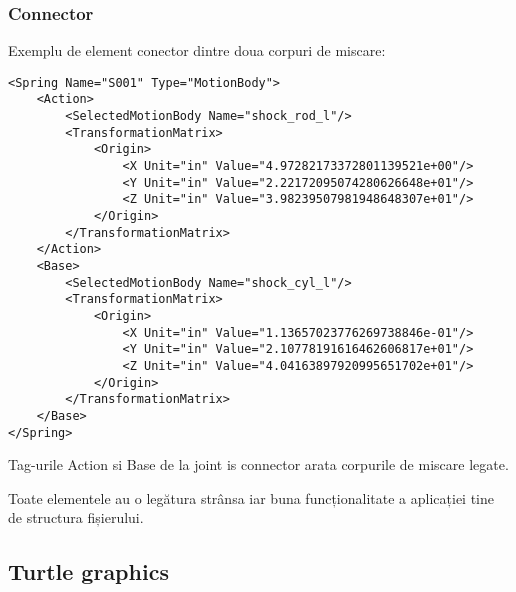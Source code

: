 \subsubsection{Connector}
Exemplu de element conector dintre doua corpuri de miscare:

\lstset{language=XML}
\begin{lstlisting}
<Spring Name="S001" Type="MotionBody">
    <Action>
        <SelectedMotionBody Name="shock_rod_l"/>
        <TransformationMatrix>
            <Origin>
                <X Unit="in" Value="4.97282173372801139521e+00"/>
                <Y Unit="in" Value="2.22172095074280626648e+01"/>
                <Z Unit="in" Value="3.98239507981948648307e+01"/>
            </Origin>
        </TransformationMatrix>
    </Action>
    <Base>
        <SelectedMotionBody Name="shock_cyl_l"/>
        <TransformationMatrix>
            <Origin>
                <X Unit="in" Value="1.13657023776269738846e-01"/>
                <Y Unit="in" Value="2.10778191616462606817e+01"/>
                <Z Unit="in" Value="4.04163897920995651702e+01"/>
            </Origin>
        </TransformationMatrix>
    </Base>
</Spring>
\end{lstlisting}

Tag-urile Action si Base de la joint is connector arata corpurile de miscare legate.

Toate elementele au o legătura strânsa iar buna funcționalitate a aplicației tine de structura fișierului.

\subsection{Turtle graphics}
